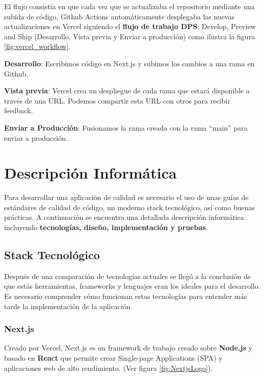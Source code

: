 \documentclass[12pt,twoside,titlepage]{report}
\begin{document}
El flujo consistía en que cada vez que se actualizaba el repositorio mediante una subida de código, Github Actions automáticamente desplegaba las nuevas actualizaciones en Vercel siguiendo el \textbf{flujo de trabajo DPS}: Develop, Preview and Ship (Desarrollo, Vista previa y Enviar a producción) como ilustra la figura \ref{fig:vercel_workflow}.

\begin{compactitem}
    \item \textbf{Desarrollo}: Escribimos código en Next.js y subimos los cambios a una rama en Github.
    \item \textbf{Vista previa}: Vercel crea un despliegue de cada rama que estará disponible a través de una URL. Podemos compartir esta URL con otros para recibir feedback. 
    \item \textbf{Enviar a Producción}: Fusionamos la rama creada con la rama ``main'' para enviar a producción.
\end{compactitem}


\chapter{Descripción Informática}

Para desarrollar una aplicación de calidad es necesario el uso de unas guías de estándares de calidad de código, un moderno stack tecnológico, así como buenas prácticas. A continuación se encuentra una detallada descripción informática incluyendo \textbf{tecnologías, diseño, implementación y pruebas}.

\section{Stack Tecnológico}

Después de una comparación de tecnologías actuales se llegó a la conclusión de que estás herramientas, frameworks y lenguajes eran los ideales para el desarrollo. Es necesario comprender cómo funcionan estas tecnologías para entender más tarde la implementación de la aplicación.

\subsection{Next.js}

Creado por Vercel, Next.js es un framework de trabajo creado sobre \textbf{Node.js} y basado en \textbf{React} que permite crear Single-page Applications (SPA) y aplicaciones web de alto rendimiento.
(Ver figura \ref{fig:NextjsLogo}).
\end{document}
